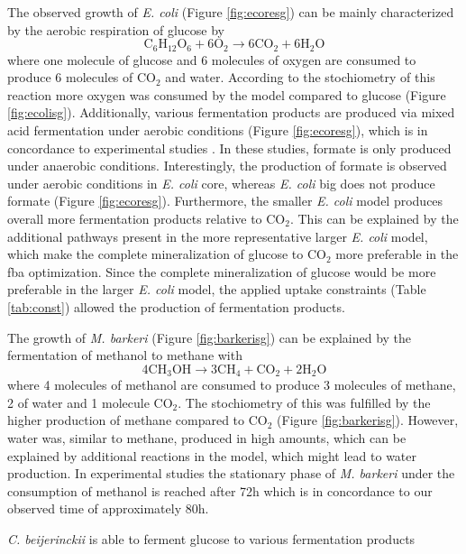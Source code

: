 The observed growth of \emph{E. coli} (Figure \hyperref[fig:ecoresg]{\ref{fig:ecoresg}}) can be mainly characterized by the aerobic respiration of glucose by 
\[
  \textrm{C}_{6}\textrm{H}_{12}\textrm{O}_{6} + 6\textrm{O}_2 \rightarrow 6\textrm{CO}_{2} + 6 \textrm{H}_{2}\textrm{O}
\]
where one molecule of glucose and 6 molecules of oxygen are consumed to produce 6 molecules of CO$_2$ and water. According to the stochiometry of this reaction more oxygen was consumed by the model compared to glucose (Figure \hyperref[fig:ecolisg]{\ref{fig:ecolisg}}). Additionally, various fermentation products are produced via mixed acid fermentation under aerobic conditions (Figure \hyperref[fig:ecoresg]{\ref{fig:ecoresg}}), which is in concordance to experimental studies \cite{Sunya13}.
In these studies, formate is only produced under anaerobic conditions. Interestingly, the production of formate is observed under aerobic conditions in \emph{E. coli} core, whereas \emph{E. coli} big does not produce formate (Figure \hyperref[fig:ecoresg]{\ref{fig:ecoresg}}).
Furthermore, the smaller \emph{E. coli} model produces overall more fermentation products relative to CO$_2$. This can be explained by the additional pathways present in the more representative larger \emph{E. coli} model, which make the complete mineralization of glucose to CO$_2$ more preferable in the fba optimization.
Since the complete mineralization of glucose would be more preferable in the larger \emph{E. coli} model, the applied uptake constraints (Table \hyperref[ab:const]{\ref{tab:const}}) allowed the production of fermentation products.

The growth of \emph{M. barkeri} (Figure \hyperref[fig:barkerisg]{\ref{fig:barkerisg}}) can be explained by the fermentation of methanol to methane with
\[
  4\textrm{CH}_{3}\textrm{OH} \rightarrow 3\textrm{CH}_{4} + \textrm{CO}_{2} + 2\textrm{H}_{2}\textrm{O}
\]
where 4 molecules of methanol are consumed to produce 3 molecules of methane, 2 of water and 1 molecule CO$_2$.
The stochiometry of this was fulfilled by the higher production of methane compared to CO$_2$ (Figure \hyperref[fig:barkerisg]{\ref{fig:barkerisg}}). However, water was, similar to methane, produced in high amounts, which can be explained by additional reactions in the model, which might lead to water production.
In experimental studies the stationary phase of \emph{M. barkeri} under the consumption of methanol is reached after 72\;h \cite{Hippe79} which is in concordance to our observed time of approximately 80\;h. 

\textit{C. beijerinckii} is able to ferment glucose to various fermentation products 

